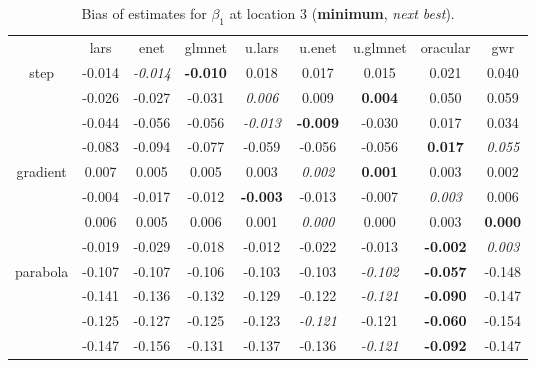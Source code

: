 \documentclass[authoryear, review, 11pt]{elsarticle}
\begin{document}
\begin{table}[ht]
\begin{center}
\begin{tabular}{ccccccccc}
  & lars & enet & glmnet & u.lars & u.enet & u.glmnet & oracular & gwr \\ 
  \cline{2-9}
  \multirow{4}{*}{step} & -0.014 & \emph{-0.014} & \textbf{-0.010} & 0.018 & 0.017 & 0.015 & 0.021 & 0.040 \\ 
  & -0.026 & -0.027 & -0.031 & \emph{0.006} & 0.009 & \textbf{0.004} & 0.050 & 0.059 \\ 
  & -0.044 & -0.056 & -0.056 & \emph{-0.013} & \textbf{-0.009} & -0.030 & 0.017 & 0.034 \\ 
  & -0.083 & -0.094 & -0.077 & -0.059 & -0.056 & -0.056 & \textbf{0.017} & \emph{0.055} \\ 
  \cline{2-9}
  \multirow{4}{*}{gradient} & 0.007 & 0.005 & 0.005 & 0.003 & \emph{0.002} & \textbf{0.001} & 0.003 & 0.002 \\ 
  & -0.004 & -0.017 & -0.012 & \textbf{-0.003} & -0.013 & -0.007 & \emph{0.003} & 0.006 \\ 
  & 0.006 & 0.005 & 0.006 & 0.001 & \emph{0.000} & 0.000 & 0.003 & \textbf{0.000} \\ 
  & -0.019 & -0.029 & -0.018 & -0.012 & -0.022 & -0.013 & \textbf{-0.002} & \emph{0.003} \\ 
  \cline{2-9}
  \multirow{4}{*}{parabola} & -0.107 & -0.107 & -0.106 & -0.103 & -0.103 & \emph{-0.102} & \textbf{-0.057} & -0.148 \\ 
  & -0.141 & -0.136 & -0.132 & -0.129 & -0.122 & \emph{-0.121} & \textbf{-0.090} & -0.147 \\ 
  & -0.125 & -0.127 & -0.125 & -0.123 & \emph{-0.121} & -0.121 & \textbf{-0.060} & -0.154 \\ 
  & -0.147 & -0.156 & -0.131 & -0.137 & -0.136 & \emph{-0.121} & \textbf{-0.092} & -0.147 \\ 
  \end{tabular}
\caption{Bias of estimates for $\beta_1$ at location 3 (\textbf{minimum}, \emph{next best}).\label{table:loc3-X1-BiasX}}
\end{center}
\end{table}
\end{document}
